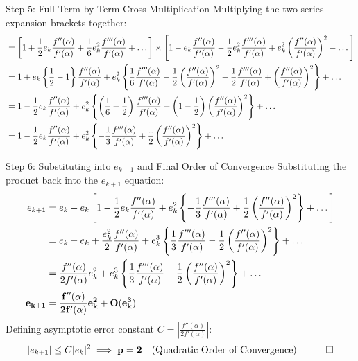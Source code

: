 \documentclass[11pt,a4paper]{article}
\begin{document}
\begin{exbox}{Step 5: Full Term-by-Term Cross Multiplication}
Multiplying the two series expansion brackets together:
\begin{align}
    &= \left[ 1 + \frac{1}{2} e_k \frac{f''(\alpha)}{f'(\alpha)} + \frac{1}{6} e_k^2 \frac{f'''(\alpha)}{f'(\alpha)} + \dots \right] \times \left[ 1 - e_k \frac{f''(\alpha)}{f'(\alpha)} - \frac{1}{2} e_k^2 \frac{f'''(\alpha)}{f'(\alpha)} + e_k^2 \left(\frac{f''(\alpha)}{f'(\alpha)}\right)^2 - \dots \right] \notag \\
    &= 1 + e_k \left\{ \frac{1}{2} - 1 \right\} \frac{f''(\alpha)}{f'(\alpha)} + e_k^2 \left\{ \frac{1}{6}\frac{f'''(\alpha)}{f'(\alpha)} - \frac{1}{2}\left(\frac{f''(\alpha)}{f'(\alpha)}\right)^2 - \frac{1}{2}\frac{f'''(\alpha)}{f'(\alpha)} + \left(\frac{f''(\alpha)}{f'(\alpha)}\right)^2 \right\} + \dots \notag \\
    &= 1 - \frac{1}{2} e_k \frac{f''(\alpha)}{f'(\alpha)} + e_k^2 \left\{ \left(\frac{1}{6} - \frac{1}{2}\right)\frac{f'''(\alpha)}{f'(\alpha)} + \left(1 - \frac{1}{2}\right)\left(\frac{f''(\alpha)}{f'(\alpha)}\right)^2 \right\} + \dots \notag \\
    &= 1 - \frac{1}{2} e_k \frac{f''(\alpha)}{f'(\alpha)} + e_k^2 \left\{ -\frac{1}{3}\frac{f'''(\alpha)}{f'(\alpha)} + \frac{1}{2}\left(\frac{f''(\alpha)}{f'(\alpha)}\right)^2 \right\} + \dots
\end{align}
\end{exbox}

\begin{exbox}{Step 6: Substituting into $e_{k+1}$ and Final Order of Convergence}
Substituting the product back into the $e_{k+1}$ equation:
\begin{align}
    e_{k+1} &= e_k - e_k \left[ 1 - \frac{1}{2} e_k \frac{f''(\alpha)}{f'(\alpha)} + e_k^2 \left\{ -\frac{1}{3}\frac{f'''(\alpha)}{f'(\alpha)} + \frac{1}{2}\left(\frac{f''(\alpha)}{f'(\alpha)}\right)^2 \right\} + \dots \right] \notag \\
    &= e_k - e_k + \frac{e_k^2}{2} \frac{f''(\alpha)}{f'(\alpha)} + e_k^3 \left\{ \frac{1}{3}\frac{f'''(\alpha)}{f'(\alpha)} - \frac{1}{2}\left(\frac{f''(\alpha)}{f'(\alpha)}\right)^2 \right\} + \dots \notag \\
    &= \frac{f''(\alpha)}{2 f'(\alpha)} e_k^2 + e_k^3 \left\{ \frac{1}{3}\frac{f'''(\alpha)}{f'(\alpha)} - \frac{1}{2}\left(\frac{f''(\alpha)}{f'(\alpha)}\right)^2 \right\} + \dots \notag \\
    \mathbf{e_{k+1}} &= \mathbf{\frac{f''(\alpha)}{2 f'(\alpha)} e_k^2 + O(e_k^3)}
\end{align}
Defining asymptotic error constant $C = \left| \frac{f''(\alpha)}{2 f'(\alpha)} \right|$:
\begin{equation}
    |e_{k+1}| \le C |e_k|^2 \implies \mathbf{p = 2 \quad \text{(Quadratic Order of Convergence)}} \quad \qed
\end{equation}
\end{exbox}
\end{document}
